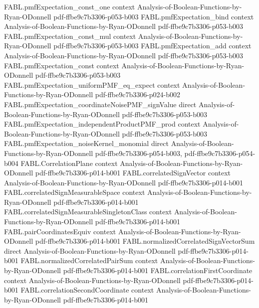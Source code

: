 \begin{theorem}
\proofstep
  {FABL.pmfExpectation_const_one}
  {context}
  {Analysis-of-Boolean-Functions-by-Ryan-ODonnell}
  {pdf-ffbe9c7b3306-p053-b003}
\proofstep
  {FABL.pmfExpectation_bind}
  {context}
  {Analysis-of-Boolean-Functions-by-Ryan-ODonnell}
  {pdf-ffbe9c7b3306-p053-b003}
\proofstep
  {FABL.pmfExpectation_const_mul}
  {context}
  {Analysis-of-Boolean-Functions-by-Ryan-ODonnell}
  {pdf-ffbe9c7b3306-p053-b003}
\proofstep
  {FABL.pmfExpectation_add}
  {context}
  {Analysis-of-Boolean-Functions-by-Ryan-ODonnell}
  {pdf-ffbe9c7b3306-p053-b003}
\proofstep
  {FABL.pmfExpectation_const}
  {context}
  {Analysis-of-Boolean-Functions-by-Ryan-ODonnell}
  {pdf-ffbe9c7b3306-p053-b003}
\proofstep
  {FABL.pmfExpectation_uniformPMF_eq_expect}
  {context}
  {Analysis-of-Boolean-Functions-by-Ryan-ODonnell}
  {pdf-ffbe9c7b3306-p024-b002}
\proofstep
  {FABL.pmfExpectation_coordinateNoisePMF_signValue}
  {direct}
  {Analysis-of-Boolean-Functions-by-Ryan-ODonnell}
  {pdf-ffbe9c7b3306-p053-b003}
\proofstep
  {FABL.pmfExpectation_independentProductPMF_prod}
  {context}
  {Analysis-of-Boolean-Functions-by-Ryan-ODonnell}
  {pdf-ffbe9c7b3306-p053-b003}
\proofstep
  {FABL.pmfExpectation_noiseKernel_monomial}
  {direct}
  {Analysis-of-Boolean-Functions-by-Ryan-ODonnell}
  {pdf-ffbe9c7b3306-p054-b003,
    pdf-ffbe9c7b3306-p054-b004}
\proofstep
  {FABL.CorrelationPlane}
  {context}
  {Analysis-of-Boolean-Functions-by-Ryan-ODonnell}
  {pdf-ffbe9c7b3306-p014-b001}
\proofstep
  {FABL.correlatedSignVector}
  {context}
  {Analysis-of-Boolean-Functions-by-Ryan-ODonnell}
  {pdf-ffbe9c7b3306-p014-b001}
\proofstep
  {FABL.correlatedSignMeasurableSpace}
  {context}
  {Analysis-of-Boolean-Functions-by-Ryan-ODonnell}
  {pdf-ffbe9c7b3306-p014-b001}
\proofstep
  {FABL.correlatedSignMeasurableSingletonClass}
  {context}
  {Analysis-of-Boolean-Functions-by-Ryan-ODonnell}
  {pdf-ffbe9c7b3306-p014-b001}
\proofstep
  {FABL.pairCoordinatesEquiv}
  {context}
  {Analysis-of-Boolean-Functions-by-Ryan-ODonnell}
  {pdf-ffbe9c7b3306-p014-b001}
\proofstep
  {FABL.normalizedCorrelatedSignVectorSum}
  {direct}
  {Analysis-of-Boolean-Functions-by-Ryan-ODonnell}
  {pdf-ffbe9c7b3306-p014-b001}
\proofstep
  {FABL.normalizedCorrelatedPairSum}
  {context}
  {Analysis-of-Boolean-Functions-by-Ryan-ODonnell}
  {pdf-ffbe9c7b3306-p014-b001}
\proofstep
  {FABL.correlationFirstCoordinate}
  {context}
  {Analysis-of-Boolean-Functions-by-Ryan-ODonnell}
  {pdf-ffbe9c7b3306-p014-b001}
\proofstep
  {FABL.correlationSecondCoordinate}
  {context}
  {Analysis-of-Boolean-Functions-by-Ryan-ODonnell}
  {pdf-ffbe9c7b3306-p014-b001}
\proofstep

\end{theorem}

